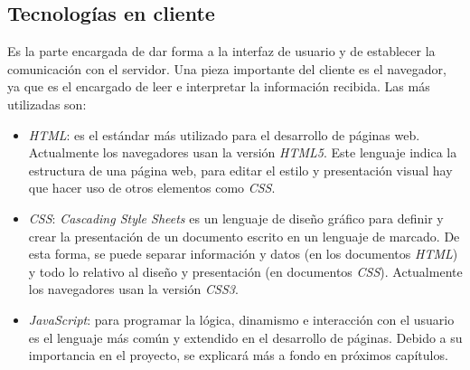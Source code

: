 \subsection{Tecnologías en cliente}
\label{subsec:tecclient}
Es la parte encargada de dar forma a la interfaz de usuario y de establecer la comunicación con el servidor. Una pieza importante del cliente es el navegador, ya que es el encargado de leer e interpretar la información recibida. Las más utilizadas son: 
\begin{itemize}
    \item \textit{HTML}: es el estándar más utilizado para el desarrollo de páginas web. Actualmente los navegadores usan la versión \textit{HTML5}. Este lenguaje indica la estructura de una página web, para editar el estilo y presentación visual hay que hacer uso de otros elementos como \textit{CSS}.
    \item \textit{CSS}: \textit{Cascading Style Sheets} es un lenguaje de diseño gráfico para definir y crear la presentación de un documento escrito en un lenguaje de marcado. De esta forma, se puede separar información y datos (en los documentos \textit{HTML}) y todo lo relativo al diseño y presentación (en documentos \textit{CSS}). Actualmente los navegadores usan la versión \textit{CSS3}.
    \item \textit{JavaScript}: para programar la lógica, dinamismo e interacción con el usuario es el lenguaje más común y extendido en el desarrollo de páginas. Debido a su importancia en el proyecto, se explicará más a fondo en próximos capítulos. 
\end{itemize}

